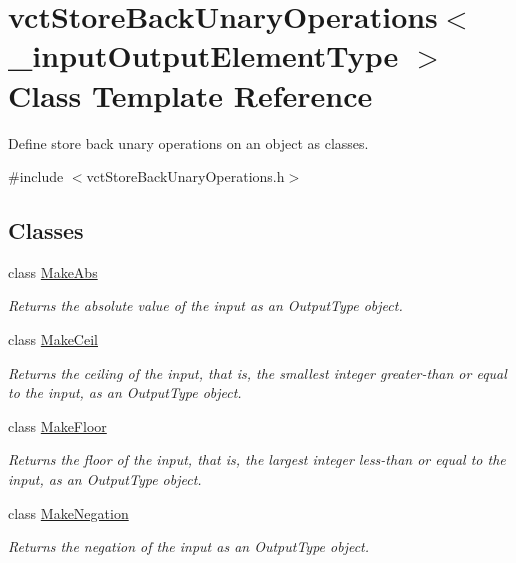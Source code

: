 \hypertarget{classvct_store_back_unary_operations}{}\section{vct\+Store\+Back\+Unary\+Operations$<$ \+\_\+input\+Output\+Element\+Type $>$ Class Template Reference}
\label{classvct_store_back_unary_operations}


Define store back unary operations on an object as classes.  




{\ttfamily \#include $<$vct\+Store\+Back\+Unary\+Operations.\+h$>$}

\subsection*{Classes}
\begin{DoxyCompactItemize}
\item 
class \hyperlink{classvct_store_back_unary_operations_1_1_make_abs}{Make\+Abs}
\begin{DoxyCompactList}\small\item\em Returns the absolute value of the input as an Output\+Type object. \end{DoxyCompactList}\item 
class \hyperlink{classvct_store_back_unary_operations_1_1_make_ceil}{Make\+Ceil}
\begin{DoxyCompactList}\small\item\em Returns the ceiling of the input, that is, the smallest integer greater-\/than or equal to the input, as an Output\+Type object. \end{DoxyCompactList}\item 
class \hyperlink{classvct_store_back_unary_operations_1_1_make_floor}{Make\+Floor}
\begin{DoxyCompactList}\small\item\em Returns the floor of the input, that is, the largest integer less-\/than or equal to the input, as an Output\+Type object. \end{DoxyCompactList}\item 
class \hyperlink{classvct_store_back_unary_operations_1_1_make_negation}{Make\+Negation}
\begin{DoxyCompactList}\small\item\em Returns the negation of the input as an Output\+Type object. \end{DoxyCompactList}\end{DoxyCompactItemize}
